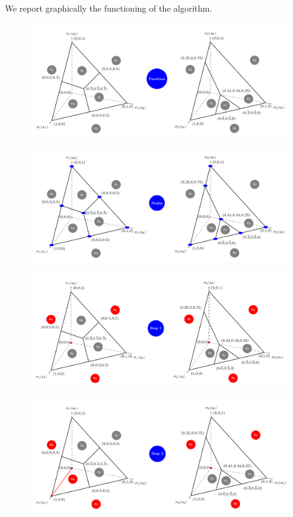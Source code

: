 \noindent
We report graphically the functioning of the algorithm.
\begin{figure}[H]
\centering
\includegraphics[width=\textwidth]{images/img_2_13_02.png}
\end{figure}
\begin{figure}[H]
\centering
\includegraphics[width=\textwidth]{images/img_2_13_03.png}
\end{figure}
\begin{figure}[H]
\centering
\includegraphics[width=\textwidth]{images/img_2_13_04.png}
\end{figure}
\begin{figure}[H]
\centering
\includegraphics[width=\textwidth]{images/img_2_13_05.png}
\end{figure}
